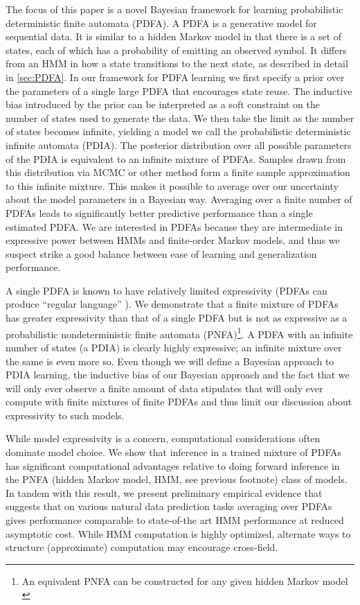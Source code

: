 The focus of this paper is a novel Bayesian framework for learning probabilistic deterministic finite automata (PDFA).  A PDFA is a generative model for sequential data.  It is similar to a hidden Markov model in that there is a set of states, each of which has a probability of emitting an observed symbol.  It differs from an HMM in how a state transitions to the next state, as described in detail in \ref{sec:PDFA}.  In our framework for PDFA learning we first specify a prior over the parameters of a single large PDFA that encourages state reuse.  The inductive bias introduced by the prior can be interpreted as a soft constraint on the number of states used to generate the data.  We then take the limit as the number of states becomes infinite, yielding a model we call the probabilistic deterministic infinite automata (PDIA).  The posterior distribution over all possible parameters of the PDIA is equivalent to an infinite mixture of PDFAs.  Samples drawn from this distribution via MCMC or other method form a finite sample approximation to this infinite mixture.  This makes it possible to average over our uncertainty about the model parameters in a Bayesian way.  Averaging over a finite number of PDFAs leads to significantly better predictive performance than a single estimated PDFA.  We are interested in PDFAs because they are intermediate in expressive power between HMMs and finite-order Markov models, and thus we suspect strike a good balance between ease of learning and generalization performance.

A single PDFA is known to have relatively limited expressivity (PDFAs can produce ``regular language'' \cite{Dupont2005}).  We demonstrate that a finite mixture of PDFAs has greater expressivity than that of a single PDFA but is not as expressive as a probabilistic nondeterministic finite automata (PNFA)\footnote{An equivalent PNFA can be constructed for any given hidden Markov model \cite{Dupont2005} }.  A PDFA with an infinite number of states (a PDIA) is clearly highly expressive; an infinite mixture over the same is even more so.  Even though we will define a Bayesian approach to PDIA learning, the inductive bias of our Bayesian approach and the fact that we will only ever observe a finite amount of data stipulates that will only ever compute with finite mixtures of finite PDFAs and thus limit our discussion about expressivity to such models.   

While model expressivity is a concern, computational considerations often dominate model choice.  We show that inference in a trained mixture of PDFAs has significant computational advantages relative to doing forward inference in the PNFA (hidden Markov model, HMM, see previous footnote) class of models.   In tandem with this result, we present preliminary empirical evidence that suggests that on various natural data prediction tasks averaging over PDFAs gives performance comparable to state-of-the art HMM performance at reduced asymptotic cost.  While HMM computation is highly optimized, alternate ways to structure (approximate) computation may encourage cross-field.

